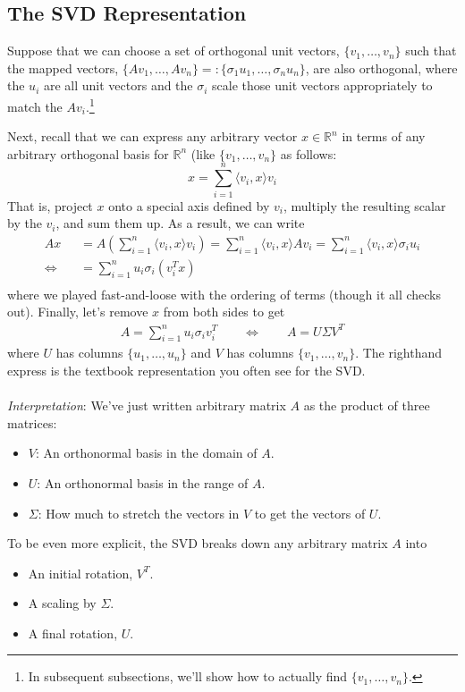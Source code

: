 \documentclass[12pt]{article}
\begin{document}
\subsection{The SVD Representation}

Suppose that we can choose a set of orthogonal unit
vectors, $\{v_1,\ldots,v_n\}$ such that the mapped vectors,
$\{Av_1,\ldots,Av_n\}=:\{\sigma_1 u_1, \ldots, \sigma_n u_n\}$, are also
orthogonal, where the $u_i$ are all unit vectors and the $\sigma_i$
scale those unit vectors appropriately to match the $Av_i$.\footnote{In
subsequent subsections, we'll show how to actually find
$\{v_1,\ldots,v_n\}$.}

Next, recall that we can express any arbitrary vector $x\in\mathbb{R}^n$
in terms of any arbitrary orthogonal basis for $\mathbb{R}^n$ (like
$\{v_1,\ldots,v_n\}$ as follows:
\[
  x = \sum^n_{i=1} \langle v_i, x\rangle v_i
\]
That is, project $x$ onto a special axis defined by $v_i$, multiply the
resulting scalar by the $v_i$, and sum them up. As a result, we can
write
\begin{align*}
  Ax &= A\left(\sum^n_{i=1} \langle v_i, x\rangle v_i\right)
  = \sum^n_{i=1} \langle v_i, x\rangle A v_i
  = \sum^n_{i=1} \langle v_i, x\rangle \sigma_i u_i\\
  \Leftrightarrow \quad &= \sum^n_{i=1} u_i \sigma_i (v_i^T x)\\
\end{align*}
where we played fast-and-loose with the ordering of terms (though it all
checks out). Finally, let's remove $x$ from both sides to get
\begin{align*}
  A = \sum^n_{i=1} u_i \sigma_i v_i^T
  \qquad \Leftrightarrow \qquad
  A = U \Sigma V^T
\end{align*}
where $U$ has columns $\{u_1,\ldots,u_n\}$ and $V$ has columns
$\{v_1,\ldots,v_n\}$. The righthand express is the textbook
representation you often see for the SVD.
\\
\\
{\sl Interpretation}: We've just written arbitrary matrix $A$ as the
product of three matrices:
\begin{itemize}
  \item $V$: An orthonormal basis in the domain of $A$.
  \item $U$: An orthonormal basis in the range of $A$.
  \item $\Sigma$: How much to stretch the vectors in $V$ to get the
    vectors of $U$.
\end{itemize}
To be even more explicit, the SVD breaks down any arbitrary matrix $A$
into
\begin{itemize}
  \item An initial rotation, $V^T$.
  \item A scaling by $\Sigma$.
  \item A final rotation, $U$.
\end{itemize}
\end{document}
